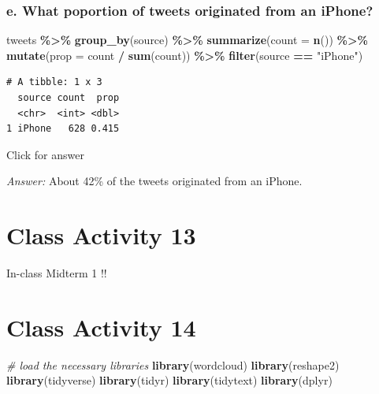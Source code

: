 \documentclass[
]{book}
\newenvironment{Shaded}{\begin{snugshade}}{\end{snugshade}}
\newcommand{\AttributeTok}[1]{\textcolor[rgb]{0.13,0.29,0.53}{#1}}
\newcommand{\CommentTok}[1]{\textcolor[rgb]{0.56,0.35,0.01}{\textit{#1}}}
\newcommand{\FunctionTok}[1]{\textcolor[rgb]{0.13,0.29,0.53}{\textbf{#1}}}
\newcommand{\NormalTok}[1]{#1}
\newcommand{\SpecialCharTok}[1]{\textcolor[rgb]{0.81,0.36,0.00}{\textbf{#1}}}
\newcommand{\StringTok}[1]{\textcolor[rgb]{0.31,0.60,0.02}{#1}}
\begin{document}
\hypertarget{e.-what-poportion-of-tweets-originated-from-an-iphone}{%
\subsection{e. What poportion of tweets originated from an iPhone?}\label{e.-what-poportion-of-tweets-originated-from-an-iphone}}

\begin{Shaded}
\begin{Highlighting}[]
\NormalTok{tweets }\SpecialCharTok{\%\textgreater{}\%} \FunctionTok{group\_by}\NormalTok{(source) }\SpecialCharTok{\%\textgreater{}\%} \FunctionTok{summarize}\NormalTok{(}\AttributeTok{count =} \FunctionTok{n}\NormalTok{()) }\SpecialCharTok{\%\textgreater{}\%}
  \FunctionTok{mutate}\NormalTok{(}\AttributeTok{prop =}\NormalTok{ count }\SpecialCharTok{/} \FunctionTok{sum}\NormalTok{(count)) }\SpecialCharTok{\%\textgreater{}\%}  \FunctionTok{filter}\NormalTok{(source }\SpecialCharTok{==} \StringTok{"iPhone"}\NormalTok{)}
\end{Highlighting}
\end{Shaded}

\begin{verbatim}
# A tibble: 1 x 3
  source count  prop
  <chr>  <int> <dbl>
1 iPhone   628 0.415
\end{verbatim}

Click for answer

\emph{Answer:} About 42\% of the tweets originated from an iPhone.

\hypertarget{class-activity-13}{%
\chapter{Class Activity 13}\label{class-activity-13}}

In-class Midterm 1 !!

\hypertarget{class-activity-14}{%
\chapter{Class Activity 14}\label{class-activity-14}}

\begin{Shaded}
\begin{Highlighting}[]
\CommentTok{\# load the necessary libraries}
\FunctionTok{library}\NormalTok{(wordcloud)}
\FunctionTok{library}\NormalTok{(reshape2)}
\FunctionTok{library}\NormalTok{(tidyverse)}
\FunctionTok{library}\NormalTok{(tidyr)}
\FunctionTok{library}\NormalTok{(tidytext)}
\FunctionTok{library}\NormalTok{(dplyr)}
\end{Highlighting}
\end{Shaded}
\end{document}

